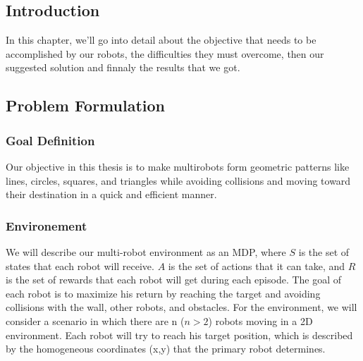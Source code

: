 \documentclass[12pt]{extarticle}
\begin{document}
\pagebreak

 

\subsection{Introduction}
In this chapter, we'll go into detail about the objective that needs to be accomplished by our robots, the difficulties they must overcome, then our suggested solution and finnaly the results that we got.




\subsection{Problem Formulation}
 
\subsubsection{Goal Definition}
Our objective in this thesis is to make multirobots form geometric patterns like lines, circles, squares, and triangles while avoiding collisions and moving toward their destination in a quick and efficient manner. 
\subsubsection{Environement}
We will describe our multi-robot environment as an MDP, where $S$ is the set of states that each robot will receive. $A$ is the set of actions that it can take, and $R$ is the set of rewards that each robot will get during each episode. The goal of each robot is to maximize his return by reaching the target and avoiding collisions with the wall, other robots, and obstacles.
For the environment, we will consider a scenario in which there are n ($n > 2$) robots moving in a 2D environment. Each robot will try to reach his target position, which is described by the homogeneous coordinates (x,y) that the primary robot determines.
\end{document}
